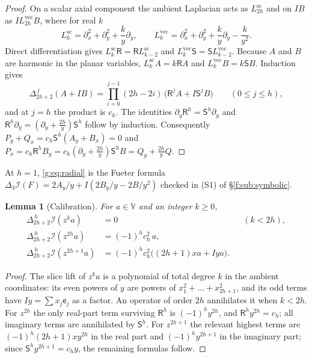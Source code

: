 \documentclass[11pt,a4paper]{article}
\numberwithin{equation}{section}
\newtheorem{lemma}[theorem]{Lemma}
\theoremstyle{definition}
\theoremstyle{remark}
\theoremstyle{plain}
\newcommand{\lap}{\Delta_4}
\newcommand{\I}{\mathcal I}
\newcommand{\lapH}{\Delta_{2h+2}^{\,h}}
\newcommand{\VV}{\mathbb V}                       %
\begin{document}
\begin{proof}
On a scalar axial component the ambient Laplacian acts as $L^{\mathrm{sc}}_{2h}$
and on $IB$ as $IL^{\mathrm{vec}}_{2h}B$, where for real $k$
\[
 L^{\mathrm{sc}}_k=\partial_x^2+\partial_y^2+\frac ky\partial_y,\qquad
 L^{\mathrm{vec}}_k=\partial_x^2+\partial_y^2+\frac ky\partial_y-\frac k{y^2}.
\]
Direct differentiation gives $L^{\mathrm{sc}}_k\mathsf R=\mathsf RL^{\mathrm{sc}}_{k-2}$
and $L^{\mathrm{vec}}_k\mathsf S=\mathsf SL^{\mathrm{vec}}_{k-2}$. Because $A$ and $B$
are harmonic in the planar variables, $L^{\mathrm{sc}}_kA=k\mathsf RA$ and
$L^{\mathrm{vec}}_kB=k\mathsf SB$. Induction gives
\[
 \Delta_{2h+2}^{\,j}(A+IB)=\prod_{i=0}^{j-1}(2h-2i)\,
 \bigl(\mathsf R^jA+I\mathsf S^jB\bigr)\qquad(0\le j\le h),
\]
and at $j=h$ the product is $c_h$. The identities
$\partial_y\mathsf R^h=\mathsf S^h\partial_y$ and
$\mathsf R^h\partial_y=(\partial_y+\tfrac{2h}y)\mathsf S^h$ follow by induction.
Consequently $P_y+Q_x=c_h\mathsf S^h(A_y+B_x)=0$ and
$P_x=c_h\mathsf R^hB_y=c_h(\partial_y+\tfrac{2h}{y})\mathsf S^hB=Q_y+\tfrac{2h}yQ$.
\end{proof}

At $h=1$, \eqref{g:eq:radial} is the Fueter formula
$\lap\I(F)=2A_y/y+I(2B_y/y-2B/y^2)$ checked in (S1) of \S\ref{f:sub:symbolic}.

\begin{lemma}[Calibration]
\label{g:lem:calibration}
For $a\in\VV$ and an integer $k\ge0$,
\begin{align}
 \lapH\I(z^ka)&=0 &&(k<2h),\label{g:eq:low-calibration}\\
 \lapH\I(z^{2h}a)&=(-1)^hc_h^2\,a,\label{g:eq:even-calibration}\\
 \lapH\I(z^{2h+1}a)&=(-1)^hc_h^2\bigl((2h+1)xa+Iya\bigr).
 \label{g:eq:odd-calibration}
\end{align}
\end{lemma}

\begin{proof}
The slice lift of $z^ka$ is a polynomial of total degree $k$ in the ambient
coordinates: its even powers of $y$ are powers of $x_1^2+\dots+x_{2h+1}^2$,
and its odd terms have $Iy=\sum x_j\mathsf e_j$ as a factor. An operator of
order $2h$ annihilates it when $k<2h$. For $z^{2h}$ the only real-part term
surviving $\mathsf R^h$ is $(-1)^hy^{2h}$, and $\mathsf R^hy^{2h}=c_h$; all
imaginary terms are annihilated by $\mathsf S^h$. For $z^{2h+1}$ the relevant
highest terms are $(-1)^h(2h+1)xy^{2h}$ in the real part and $(-1)^hy^{2h+1}$
in the imaginary part; since $\mathsf S^hy^{2h+1}=c_hy$, the remaining
formulas follow.
\end{proof}
\end{document}

